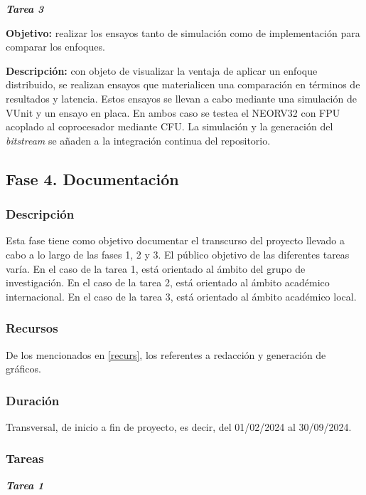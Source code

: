 \noindent \textbf{\textit{Tarea 3}}

\textbf{Objetivo:} realizar los ensayos tanto de simulación como de implementación para comparar los enfoques.

\textbf{Descripción:} con objeto de visualizar la ventaja de aplicar un enfoque distribuido, se realizan ensayos que materialicen una comparación en términos de resultados y latencia.
Estos ensayos se llevan a cabo mediante una simulación de VUnit y un ensayo en placa.
En ambos caso se testea el NEORV32 con FPU acoplado al coprocesador mediante CFU.
La simulación y la generación del \textit{bitstream} se añaden a la integración continua del repositorio. 

\subsection{Fase 4. Documentación}

\subsubsection{Descripción}

Esta fase tiene como objetivo documentar el transcurso del proyecto llevado a cabo a lo largo de las fases 1, 2 y 3.
El público objetivo de las diferentes tareas varía. 
En el caso de la tarea 1, está orientado al ámbito del grupo de investigación.
En el caso de la tarea 2, está orientado al ámbito académico internacional.
En el caso de la tarea 3, está orientado al ámbito académico local.

\subsubsection{Recursos}

De los mencionados en \ref{recurs}, los referentes a redacción y generación de gráficos.

\subsubsection{Duración}

Transversal, de inicio a fin de proyecto, es decir, del 01/02/2024 al 30/09/2024.

\subsubsection{Tareas}

\noindent \textbf{\textit{Tarea 1}}

